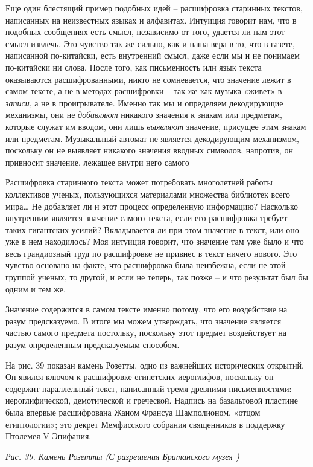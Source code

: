 \documentclass[../main.tex]{subfiles}
\begin{document}
Еще один блестящий пример подобных идей \--- расшифровка старинных текстов, написанных на неизвестных языках и алфавитах. Интуиция говорит нам, что в подобных сообщениях есть смысл, независимо от того, удается ли нам этот смысл извлечь. Это чувство так же сильно, как и наша вера в то, что в газете, написанной по-китайски, есть внутренний смысл, даже если мы и не понимаем по-китайски ни слова. После того, как письменность или язык текста оказываются расшифрованными, никто не сомневается, что значение лежит в самом тексте, а не в методах расшифровки \--- так же как музыка «живет» в \emph{записи}, а не в проигрывателе. Именно так мы и определяем декодирующие механизмы, они не \emph{добавляют} никакого значения к знакам или предметам, которые служат им вводом, они лишь \emph{выявляют} значение, присущее этим знакам или предметам. Музыкальный автомат не является декодирующим механизмом, поскольку он не выявляет никакого значения вводных символов, напротив, он привносит значение, лежащее внутри него самого

Расшифровка старинного текста может потребовать многолетней работы коллективов ученых, пользующихся материалами множества библиотек всего мира\ldots{} Не добавляет ли и этот процесс определенную информацию? Насколько внутренним является значение самого текста, если его расшифровка требует таких гигантских усилий? Вкладывается ли при этом значение в текст, или оно уже в нем находилось? Моя интуиция говорит, что значение там уже было и что весь грандиозный труд по расшифровке не привнес в текст ничего нового. Это чувство основано на факте, что расшифровка была неизбежна, если не этой группой ученых, то другой, и если не теперь, так позже \--- и что результат был бы одним и тем же.

Значение содержится в самом тексте именно потому, что его воздействие на разум предсказуемо. В итоге мы можем утверждать, что значение является частью самого предмета постольку, поскольку этот предмет воздействует на разум определенным предсказуемым способом.

На рис. 39 показан камень Розетты, одно из важнейших исторических открытий. Он явился ключом к расшифровке египетских иероглифов, поскольку он содержит параллельный текст, написанный тремя древними письменностями: иероглифической, демотической и греческой. Надпись на базальтовой пластине была впервые расшифрована Жаном Франсуа Шамполионом, «отцом египтологии»; это декрет Мемфисского собрания священников в поддержку Птолемея V Эпифания.

\emph{Рис. 39. Камень Розетты (С разрешения Британского музея )}
\end{document}
